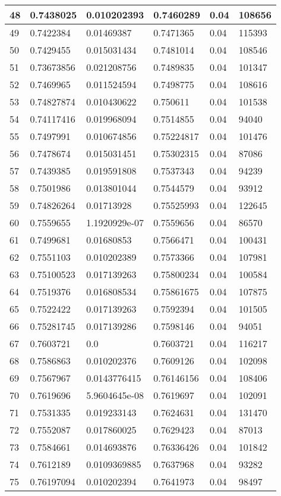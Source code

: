\begin{longtable}{|l|l|l|l|l|l|}
48 & 0.7438025 & 0.010202393 & 0.7460289 & 0.04 & 108656 \\ \hline 
49 & 0.7422384 & 0.01469387 & 0.7471365 & 0.04 & 115393 \\ \hline 
50 & 0.7429455 & 0.015031434 & 0.7481014 & 0.04 & 108546 \\ \hline 
51 & 0.73673856 & 0.021208756 & 0.7489835 & 0.04 & 101347 \\ \hline 
52 & 0.7469965 & 0.011524594 & 0.7498775 & 0.04 & 108616 \\ \hline 
53 & 0.74827874 & 0.010430622 & 0.750611 & 0.04 & 101538 \\ \hline 
54 & 0.74117416 & 0.019968094 & 0.7514855 & 0.04 & 94040 \\ \hline 
55 & 0.7497991 & 0.010674856 & 0.75224817 & 0.04 & 101476 \\ \hline 
56 & 0.7478674 & 0.015031451 & 0.75302315 & 0.04 & 87086 \\ \hline 
57 & 0.7439385 & 0.019591808 & 0.7537343 & 0.04 & 94239 \\ \hline 
58 & 0.7501986 & 0.013801044 & 0.7544579 & 0.04 & 93912 \\ \hline 
59 & 0.74826264 & 0.01713928 & 0.75525993 & 0.04 & 122645 \\ \hline 
60 & 0.7559655 & 1.1920929e-07 & 0.7559656 & 0.04 & 86570 \\ \hline 
61 & 0.7499681 & 0.01680853 & 0.7566471 & 0.04 & 100431 \\ \hline 
62 & 0.7551103 & 0.010202389 & 0.7573366 & 0.04 & 107981 \\ \hline 
63 & 0.75100523 & 0.017139263 & 0.75800234 & 0.04 & 100584 \\ \hline 
64 & 0.7519376 & 0.016808534 & 0.75861675 & 0.04 & 107875 \\ \hline 
65 & 0.7522422 & 0.017139263 & 0.7592394 & 0.04 & 101505 \\ \hline 
66 & 0.75281745 & 0.017139286 & 0.7598146 & 0.04 & 94051 \\ \hline 
67 & 0.7603721 & 0.0 & 0.7603721 & 0.04 & 116217 \\ \hline 
68 & 0.7586863 & 0.010202376 & 0.7609126 & 0.04 & 102098 \\ \hline 
69 & 0.7567967 & 0.0143776415 & 0.76146156 & 0.04 & 108406 \\ \hline 
70 & 0.7619696 & 5.9604645e-08 & 0.7619697 & 0.04 & 102091 \\ \hline 
71 & 0.7531335 & 0.019233143 & 0.7624631 & 0.04 & 131470 \\ \hline 
72 & 0.7552087 & 0.017860025 & 0.7629423 & 0.04 & 87013 \\ \hline 
73 & 0.7584661 & 0.014693876 & 0.76336426 & 0.04 & 101842 \\ \hline 
74 & 0.7612189 & 0.0109369885 & 0.7637968 & 0.04 & 93282 \\ \hline 
75 & 0.76197094 & 0.010202394 & 0.7641973 & 0.04 & 98497 \\ \hline 
\end{longtable}